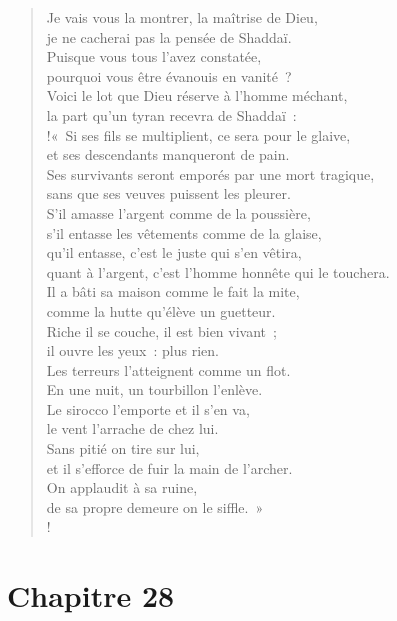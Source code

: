 \documentclass[french,twoside]{book} %
\newcommand\chapteropen{} %
\newcommand\chapterclose{} %
\begin{document}
\begin{verse}
Je vais vous la montrer, la maîtrise de Dieu, \\
je ne cacherai pas la pensée de Shaddaï.\\
Puisque vous tous l’avez constatée, \\
pourquoi vous être évanouis en vanité ?\\
Voici le lot que Dieu réserve à l’homme méchant, \\
la part qu’un tyran recevra de Shaddaï :\\!« Si ses fils se multiplient, ce sera pour le glaive, \\
et ses descendants manqueront de pain.\\
Ses survivants seront emporés par une mort tragique, \\
sans que ses veuves puissent les pleurer.\\
S’il amasse l’argent comme de la poussière, \\
s’il entasse les vêtements comme de la glaise,\\
qu’il entasse, c’est le juste qui s’en vêtira, \\
quant à l’argent, c’est l’homme honnête qui le touchera.\\
Il a bâti sa maison comme le fait la mite, \\
comme la hutte qu’élève un guetteur.\\
Riche il se couche, il est bien vivant ; \\
il ouvre les yeux : plus rien.\\
Les terreurs l’atteignent comme un flot. \\
En une nuit, un tourbillon l’enlève.\\
Le sirocco l’emporte et il s’en va, \\
le vent l’arrache de chez lui.\\
Sans pitié on tire sur lui, \\
et il s’efforce de fuir la main de l’archer.\\
On applaudit à sa ruine, \\
de sa propre demeure on le siffle. »\\!
\end{verse}
\chapterclose


\chapteropen
\chapter[{Chapitre 28}]{Chapitre 28}\renewcommand{\leftmark}{Chapitre 28}
\end{document}
